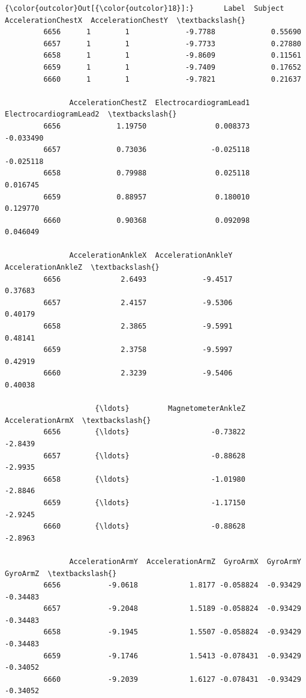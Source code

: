 \documentclass[11pt]{article}
\begin{document}
\begin{Verbatim}[commandchars=\\\{\}]
{\color{outcolor}Out[{\color{outcolor}18}]:}       Label  Subject  AccelerationChestX  AccelerationChestY  \textbackslash{}
         6656      1        1             -9.7788             0.55690   
         6657      1        1             -9.7733             0.27880   
         6658      1        1             -9.8609             0.11561   
         6659      1        1             -9.7409             0.17652   
         6660      1        1             -9.7821             0.21637   
         
               AccelerationChestZ  ElectrocardiogramLead1  ElectrocardiogramLead2  \textbackslash{}
         6656             1.19750                0.008373               -0.033490   
         6657             0.73036               -0.025118               -0.025118   
         6658             0.79988                0.025118                0.016745   
         6659             0.88957                0.180010                0.129770   
         6660             0.90368                0.092098                0.046049   
         
               AccelerationAnkleX  AccelerationAnkleY  AccelerationAnkleZ  \textbackslash{}
         6656              2.6493             -9.4517             0.37683   
         6657              2.4157             -9.5306             0.40179   
         6658              2.3865             -9.5991             0.48141   
         6659              2.3758             -9.5997             0.42919   
         6660              2.3239             -9.5406             0.40038   
         
                     {\ldots}         MagnetometerAnkleZ  AccelerationArmX  \textbackslash{}
         6656        {\ldots}                   -0.73822           -2.8439   
         6657        {\ldots}                   -0.88628           -2.9935   
         6658        {\ldots}                   -1.01980           -2.8846   
         6659        {\ldots}                   -1.17150           -2.9245   
         6660        {\ldots}                   -0.88628           -2.8963   
         
               AccelerationArmY  AccelerationArmZ  GyroArmX  GyroArmY  GyroArmZ  \textbackslash{}
         6656           -9.0618            1.8177 -0.058824  -0.93429  -0.34483   
         6657           -9.2048            1.5189 -0.058824  -0.93429  -0.34483   
         6658           -9.1945            1.5507 -0.058824  -0.93429  -0.34483   
         6659           -9.1746            1.5413 -0.078431  -0.93429  -0.34052   
         6660           -9.2039            1.6127 -0.078431  -0.93429  -0.34052   
         

\end{Verbatim}
\end{document}
